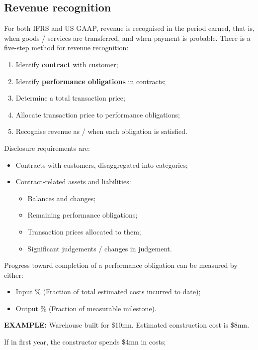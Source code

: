 \documentclass[../notes_compiled.tex]{subfiles}
\begin{document}
\subsection{Revenue recognition}
\begin{itemize}
\item For both IFRS and US GAAP, revenue is recognised in the period earned, that is, when goods / services are transferred, and when payment is probable. There is a five-step method for revenue recognition:
\begin{enumerate}
\item Identify \textbf{contract} with customer;
\item Identify \textbf{performance obligations} in contracts;
\item Determine a total transaction price;
\item Allocate transaction price to performance obligations;
\item Recognise revenue as / when each obligation is satisfied.
\end{enumerate}
\item Disclosure requirements are:
\begin{itemize}
\item Contracts with customers, disaggregated into categories;
\item Contract-related assets and liabilities:
\begin{itemize}
\item Balances and changes;
\item Remaining performance obligations;
\item Transaction prices allocated to them;
\item Significant judgements / changes in judgement.
\end{itemize}
\end{itemize}
\item Progress toward completion of a performance obligation can be measured by either:
\begin{itemize}
\item Input \% (Fraction of total estimated costs incurred to date);
\item Output \% (Fraction of measurable milestone).
\end{itemize}
{\color{RedViolet}
\item[] \textbf{EXAMPLE:} Warehouse built for \$10mn. Estimated construction cost is \$8mn.
}
\begin{itemize}
{\color{RedViolet}
\item If in first year, the constructor spends \$4mn in costs;
}
\end{itemize}
\end{itemize}
\end{document}
